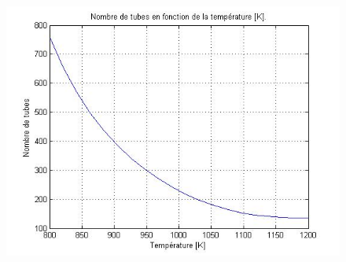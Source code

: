 \begin{figure}[htb!]
	\centering
	\includegraphics[scale=0.70]{media/etude_param/useful/tubes.jpg}
\end{figure}

